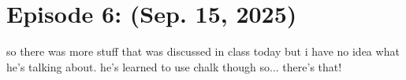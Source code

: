 \section{Episode 6: (Sep. 15, 2025)}
so there was more stuff that was discussed in class today but i have no idea what he's talking about. he's learned to use chalk though so... there's that!